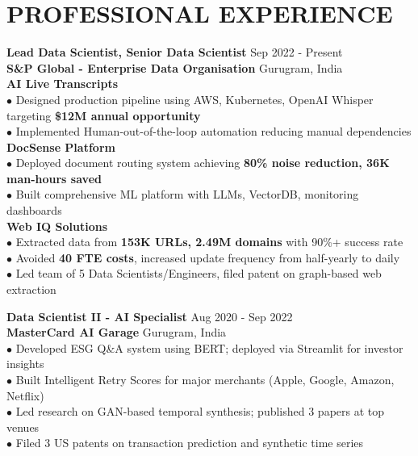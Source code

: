 \documentclass[letterpaper,11pt]{article}
\begin{document}
\begin{minipage}[t]{0.64\textwidth}
\vspace{8pt}

\section{PROFESSIONAL EXPERIENCE}

\textbf{\large Lead Data Scientist, Senior Data Scientist} \hfill \textcolor{mediumgray}{Sep 2022 - Present} \\
\textcolor{accentblue}{\textbf{S\&P Global - Enterprise Data Organisation}} \hfill \textcolor{mediumgray}{Gurugram, India} \\[2pt]

\textcolor{darktext}{\textbf{AI Live Transcripts}} \\
$\bullet$ Designed production pipeline using AWS, Kubernetes, OpenAI Whisper targeting \textbf{\$12M annual opportunity} \\
$\bullet$ Implemented Human-out-of-the-loop automation reducing manual dependencies \\[4pt]

\textcolor{darktext}{\textbf{DocSense Platform}} \\
$\bullet$ Deployed document routing system achieving \textbf{80\% noise reduction, 36K man-hours saved} \\
$\bullet$ Built comprehensive ML platform with LLMs, VectorDB, monitoring dashboards \\[4pt]

\textcolor{darktext}{\textbf{Web IQ Solutions}} \\
$\bullet$ Extracted data from \textbf{153K URLs, 2.49M domains} with 90\%+ success rate \\
$\bullet$ Avoided \textbf{40 FTE costs}, increased update frequency from half-yearly to daily \\
$\bullet$ Led team of 5 Data Scientists/Engineers, filed patent on graph-based web extraction

\vspace{8pt}
\textbf{\large Data Scientist II - AI Specialist} \hfill \textcolor{mediumgray}{Aug 2020 - Sep 2022} \\
\textcolor{accentblue}{\textbf{MasterCard AI Garage}} \hfill \textcolor{mediumgray}{Gurugram, India} \\[2pt]

$\bullet$ Developed ESG Q\&A system using BERT; deployed via Streamlit for investor insights \\
$\bullet$ Built Intelligent Retry Scores for major merchants (Apple, Google, Amazon, Netflix) \\
$\bullet$ Led research on GAN-based temporal synthesis; published 3 papers at top venues \\
$\bullet$ Filed 3 US patents on transaction prediction and synthetic time series


\end{minipage}
\end{document}
